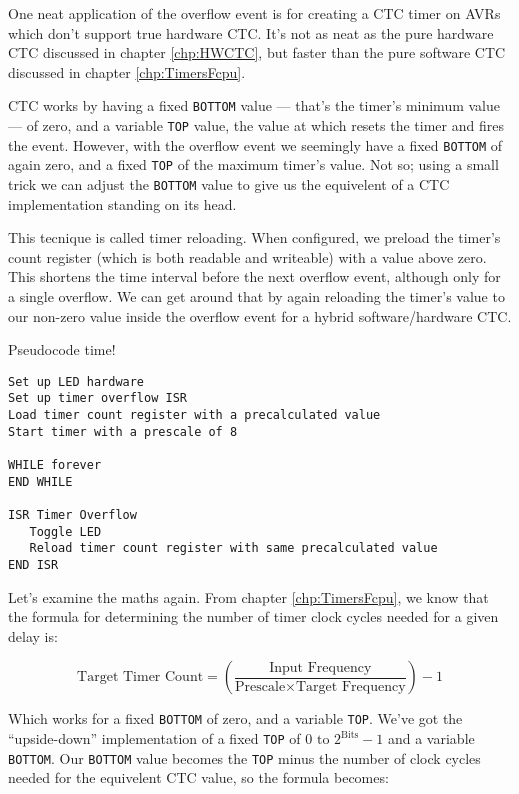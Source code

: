 \documentclass[a4paper,oneside,notitlepage]{book}
\begin{document}
One neat application of the overflow event is for creating a CTC timer on AVRs which don't support true hardware CTC. It's not as neat as the pure hardware CTC discussed in chapter \ref{chp:HWCTC}, but faster than the pure software CTC discussed in chapter \ref{chp:TimersFcpu}.

CTC works by having a fixed \texttt{BOTTOM} value --- that's the timer's minimum value --- of zero, and a variable \texttt{TOP} value, the value at which resets the timer and fires the event. However, with the overflow event we seemingly have a fixed \texttt{BOTTOM} of again zero, and a fixed \texttt{TOP} of the maximum timer's value. Not so; using a small trick we can adjust the \texttt{BOTTOM} value to give us the equivelent of a CTC implementation standing on its head.

This tecnique is called timer reloading. When configured, we preload the timer's count register (which is both readable and writeable) with a value above zero. This shortens the time interval before the next overflow event, although only for a single overflow. We can get around that by again reloading the timer's value to our non-zero value inside the overflow event for a hybrid software/hardware CTC.

Pseudocode time!

\begin{center}
\begin{lstlisting}[keywordstyle=\color{black},commentstyle=\color{black}]
Set up LED hardware
Set up timer overflow ISR
Load timer count register with a precalculated value
Start timer with a prescale of 8

WHILE forever
END WHILE

ISR Timer Overflow
   Toggle LED
   Reload timer count register with same precalculated value
END ISR
\end{lstlisting}
\end{center}

Let's examine the maths again. From chapter \ref{chp:TimersFcpu}, we know that the formula for determining the number of timer clock cycles needed for a given delay is:

\begin{displaymath}
\text{Target Timer Count} = (\frac{\text{Input Frequency}}{\text{Prescale} \times \text{Target Frequency}}) - 1
\end{displaymath}

Which works for a fixed \texttt{BOTTOM} of zero, and a variable \texttt{TOP}. We've got the ``upside-down'' implementation of a fixed \texttt{TOP} of \(0 \text{ to } 2^\text{Bits}-1\) and a variable \texttt{BOTTOM}. Our \texttt{BOTTOM} value becomes the \texttt{TOP} minus the number of clock cycles needed for the equivelent CTC value, so the formula becomes:
\end{document}
